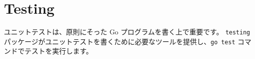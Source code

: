 \section{Testing}

ユニットテストは、原則にそった Go プログラムを書く上で重要です。 \texttt{testing} パッケージがユニットテストを書くために必要なツールを提供し、\texttt{go test} コマンドでテストを実行します。





